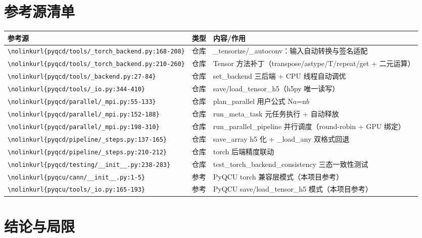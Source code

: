 \documentclass[UTF8]{ctexart}
\begin{document}
\section{参考源清单}

\begin{xltabular}{\textwidth}{llX}
\toprule
\textcolor{evidence}{参考源} & 类型 & 内容/作用 \\
\midrule
\endhead
\texttt{\nolinkurl{\nolinkurl{pyqcd/tools/_torch_backend.py:168-208}}} & 仓库 & \_tensorize/\_autoconv：输入自动转换与签名适配 \\
\texttt{\nolinkurl{\nolinkurl{pyqcd/tools/_torch_backend.py:210-260}}} & 仓库 & Tensor 方法补丁（transpose/astype/T/repeat/get + 二元运算） \\
\texttt{\nolinkurl{\nolinkurl{pyqcd/tools/_backend.py:27-84}}} & 仓库 & set\_backend 三后端 + CPU 线程自动调优 \\
\texttt{\nolinkurl{\nolinkurl{pyqcd/tools/_io.py:344-410}}} & 仓库 & save/load\_tensor\_h5（h5py 唯一读写） \\
\texttt{\nolinkurl{\nolinkurl{pyqcd/parallel/_mpi.py:55-133}}} & 仓库 & plan\_parallel 用户公式 N$a$=n$b$ \\
\texttt{\nolinkurl{\nolinkurl{pyqcd/parallel/_mpi.py:152-188}}} & 仓库 & run\_meta\_task 元任务执行 + 自动释放 \\
\texttt{\nolinkurl{\nolinkurl{pyqcd/parallel/_mpi.py:198-310}}} & 仓库 & run\_parallel\_pipeline 并行调度（round-robin + GPU 绑定） \\
\texttt{\nolinkurl{\nolinkurl{pyqcd/pipeline/_steps.py:137-165}}} & 仓库 & save\_array h5 化 + \_load\_any 双格式回退 \\
\texttt{\nolinkurl{\nolinkurl{pyqcd/pipeline/_steps.py:210-212}}} & 仓库 & torch 后端精度联动 \\
\texttt{\nolinkurl{\nolinkurl{pyqcd/testing/__init__.py:238-283}}} & 仓库 & test\_torch\_backend\_consistency 三态一致性测试 \\
\texttt{\nolinkurl{\nolinkurl{pyqcu/cann/__init__.py:1-5}}} & 参考 & PyQCU torch 兼容层模式（本项目参考） \\
\texttt{\nolinkurl{\nolinkurl{pyqcu/tools/_io.py:165-193}}} & 参考 & PyQCU save/load\_tensor\_h5 模式（本项目参考） \\
\bottomrule
\end{xltabular}

\section{结论与局限}
\end{document}

